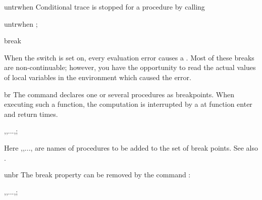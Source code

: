 \begin{Operator}{untrwhen}
Conditional trace is stopped for a procedure by calling
\begin{Syntax}
   untrwhen ;
\end{Syntax}
\end{Operator}


\begin{Switch}{break}

When the switch  is set on, every
evaluation error causes a . Most of these
breaks are non-continuable; however, you have the 
opportunity to read the actual values of local variables
in the environment which caused the error.
\end{Switch}


\begin{Operator}{br}
The command  declares one or several procedures 
as breakpoints. When executing such a function, the
computation is interrupted by a 
at function enter and return times.

\begin{Syntax}
   ,,...,;
\end{Syntax}
Here  ,,..., 
are names of procedures
to be added to the set of break points. 
See also .
\end{Operator}

\begin{Operator}{unbr}
The break property 
can be removed by the command :
\begin{Syntax}
   ,,...,;
\end{Syntax}
\end{Operator}


